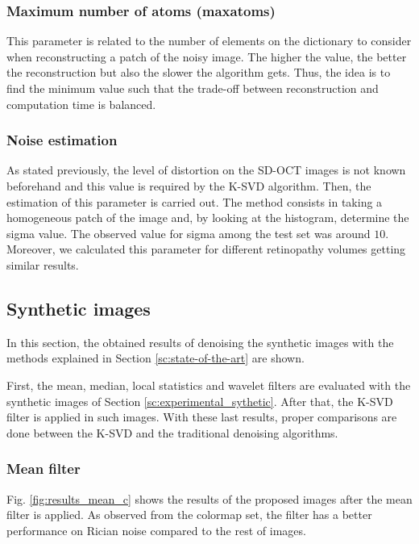 \subsubsection{Maximum number of atoms (maxatoms)}
This parameter is related to the number of elements on the dictionary to consider when reconstructing a patch of the noisy image. The higher the value, the better the reconstruction but also the slower the algorithm gets. Thus, the idea is to find the minimum value such that the trade-off between reconstruction and computation time is balanced. 
 
\subsubsection{Noise estimation} \label{sc:noise-estimation}
As stated previously, the level of distortion on the SD-OCT images is not known beforehand and this value is required by the K-SVD algorithm. Then, the estimation of this parameter is carried out. The method consists in taking a homogeneous patch of the image and, by looking at the histogram, determine the sigma value. The observed value for sigma among the test set was around $10$. Moreover, we calculated this parameter for different retinopathy volumes getting similar results.

\subsection{Synthetic images} \label{sc:results_synthetic}
In this section, the obtained results of denoising the synthetic images with the methods explained in Section \ref{sc:state-of-the-art} are shown. 

First, the mean, median, local statistics and wavelet filters are evaluated with the synthetic images of Section \ref{sc:experimental_sythetic}. After that, the K-SVD filter is applied in such images. With these last results, proper comparisons are done between the K-SVD and the traditional denoising algorithms.

\subsubsection{Mean filter}
Fig. \ref{fig:results_mean_c} shows the results of the proposed images after the mean filter is applied. As observed from the colormap set, the filter has a better performance on Rician noise compared to the rest of images.

